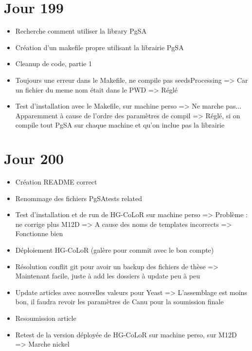 \documentclass[12pt]{report}
\begin{document}
\section{Jour 199}

\begin{itemize}
	\item Recherche comment utiliser la library PgSA
	
	\item Création d'un makefile propre utilisant la librairie PgSA
	
	\item Cleanup de code, partie 1
	
	\item Toujours une erreur dans le Makefile, ne compile pas seedsProcessing => Car un fichier du meme nom était dans le PWD => Réglé
	
	\item Test d'installation avec le Makefile, sur machine perso => Ne marche pas... Apparemment à cause de l'ordre des paramètres de compil	
			=> Réglé, si on compile tout PgSA sur chaque machine et qu'on inclue pas la librairie
\end{itemize}

\section{Jour 200}

\begin{itemize}
	\item Création README correct
	
	\item Renommage des fichiers PgSAtests related
	
	\item Test d'installation et de run de HG-CoLoR sur machine perso => Problème : ne corrige plus M12D
		  => A cause des noms de templates incorrects
		  => Fonctionne bien		  
		  
	\item Déploiement HG-CoLoR (galère pour commit avec le bon compte)
	
	\item Résolution conflit git pour avoir un backup des fichiers de thèse => Maintenant facile, juste à add les dossiers à update peu à peu
	
	\item Update articles avec nouvelles valeurs pour Yeast => L'assemblage est moins bon, il faudra revoir les paramètres
		  de Canu pour la soumission finale
	
	\item Resoumission article
	
	\item Retest de la version déployée de HG-CoLoR sur machine perso, sur M12D => Marche nickel
\end{itemize}
\end{document}
